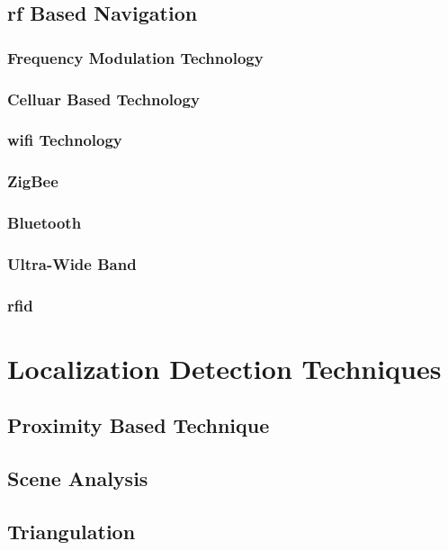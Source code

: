 \subsection{\acf{rf} Based Navigation}

\subsubsection{Frequency Modulation Technology}

\subsubsection{Celluar Based Technology}

\subsubsection{\ac{wifi} Technology}

\subsubsection{ZigBee}

\subsubsection{Bluetooth}

\subsubsection{Ultra-Wide Band}

\subsubsection{\ac{rfid}}

\section{Localization Detection Techniques}

\subsection{Proximity Based Technique}

\subsection{Scene Analysis}

\subsection{Triangulation}

